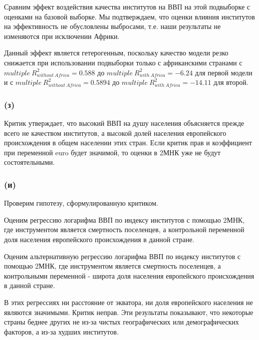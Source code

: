 \documentclass[a4paper,12pt]{article} %
\begin{document}
Сравним эффект воздействия качества институтов на ВВП на этой
подвыборке с оценками на базовой выборке. 
Мы подтверждаем, что оценки влияния институтов на эффективность не обусловлены выбросами, т.е. наши результаты  не изменяются при  исключении Африки. 

Данный эффект является гетерогенным, поскольку качество модели резко снижается при использовании подвыборки только с африканскими странами с $ multiple \ R^2_{without \ Africa} = 0.588   $ до $ multiple \ R^2_{with \ Africa} = -6.24  $  для первой модели и с $ multiple \ R^2_{without \ Africa} = 0.5894   $  до $ multiple \ R^2_{with \ Africa} = -14.11   $  для второй.   
	
\subsubsection*{(з)}	

Критик утверждает, что высокий ВВП на душу
населения 
объясняется прежде всего не качеством институтов, а высокой долей
населения европейского происхождения в общем населении этих стран.
Если критик прав и коэффициент при переменной euro будет значимой, то оценки в 2МНК уже не будут  состоятельными.
  


\subsubsection*{(и)}	

Проверим гипотезу, сформулированную критиком. 

Оценим регрессию логарифма ВВП по индексу институтов с помощью 2МНК, где инструментом является смертность  поселенцев, а контрольной переменной доля населения европейского происхождения в данной
стране.


Оценим альтернативную регрессию логарифма ВВП по индексу институтов с помощью 2МНК, где инструментом является смертность  поселенцев, а контрольными переменной - широта доля населения европейского происхождения в данной
стране.


В этих регрессиях ни расстояние от экватора, ни доля европейского населения не являются значимыми. Критик неправ. Эти результаты показывают, что некоторые страны  беднее других не из-за чистых географических или демографических  факторов, а из-за худших институтов.


	
\end{document}

